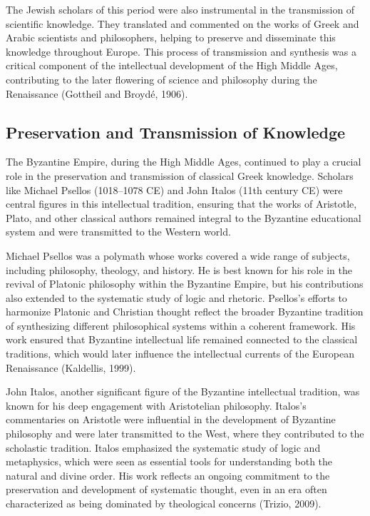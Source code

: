 \documentclass[twocolumn]{article}
\begin{document}
\textcolor{secondary}{The Jewish scholars of this period were also instrumental in the transmission of scientific knowledge. They translated and commented on the works of Greek and Arabic scientists and philosophers, helping to preserve and disseminate this knowledge throughout Europe. This process of transmission and synthesis was a critical component of the intellectual development of the High Middle Ages, contributing to the later flowering of science and philosophy during the Renaissance (Gottheil and Broydé, 1906).}

\subsection{Preservation and Transmission of Knowledge}

\textcolor{primary}{The Byzantine Empire, during the High Middle Ages, continued to play a crucial role in the preservation and transmission of classical Greek knowledge. Scholars like Michael Psellos (1018–1078 CE) and John Italos (11th century CE) were central figures in this intellectual tradition, ensuring that the works of Aristotle, Plato, and other classical authors remained integral to the Byzantine educational system and were transmitted to the Western world.}

\textcolor{secondary}{Michael Psellos was a polymath whose works covered a wide range of subjects, including philosophy, theology, and history. He is best known for his role in the revival of Platonic philosophy within the Byzantine Empire, but his contributions also extended to the systematic study of logic and rhetoric. Psellos’s efforts to harmonize Platonic and Christian thought reflect the broader Byzantine tradition of synthesizing different philosophical systems within a coherent framework. His work ensured that Byzantine intellectual life remained connected to the classical traditions, which would later influence the intellectual currents of the European Renaissance (Kaldellis, 1999).}

\textcolor{primary}{John Italos, another significant figure of the Byzantine intellectual tradition, was known for his deep engagement with Aristotelian philosophy. Italos’s commentaries on Aristotle were influential in the development of Byzantine philosophy and were later transmitted to the West, where they contributed to the scholastic tradition. Italos emphasized the systematic study of logic and metaphysics, which were seen as essential tools for understanding both the natural and divine order. His work reflects an ongoing commitment to the preservation and development of systematic thought, even in an era often characterized as being dominated by theological concerns (Trizio, 2009).}
\end{document}

